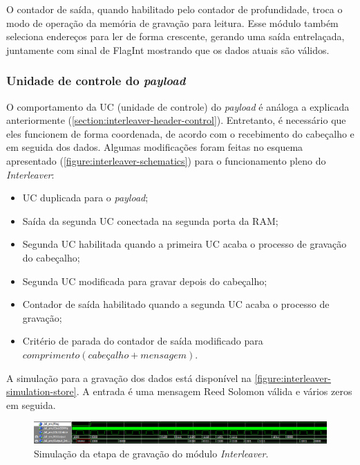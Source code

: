 	O contador de saída, quando habilitado pelo contador de profundidade, troca o modo de operação da memória de gravação para leitura. Esse módulo também seleciona endereços para ler de forma crescente, gerando uma saída entrelaçada, juntamente com sinal de FlagInt mostrando que os dados atuais são válidos.
	
	\subsubsection{Unidade de controle do \textit{payload}}
	
	O comportamento da UC (unidade de controle) do \textit{payload} é análoga a explicada anteriormente (\autoref{section:interleaver-header-control}). Entretanto, é necessário que eles funcionem de forma coordenada, de acordo com o recebimento do cabeçalho e em seguida dos dados. Algumas modificações foram feitas no esquema apresentado (\autoref{figure:interleaver-schematics}) para o funcionamento pleno do \textit{Interleaver}: 
	
	\begin{itemize}
		\item UC duplicada para o \textit{payload};
		\item Saída da segunda UC conectada na segunda porta da RAM;
		\item Segunda UC habilitada quando a primeira UC acaba o processo de gravação do cabeçalho;
		\item Segunda UC modificada para gravar depois do cabeçalho;
		\item Contador de saída habilitado quando a segunda UC acaba o processo de gravação;
		\item Critério de parada do contador de saída modificado para $comprimento(cabeçalho + mensagem)$.
	\end{itemize}
	
	A simulação para a gravação dos dados está disponível na \autoref{figure:interleaver-simulation-store}. A entrada é uma mensagem Reed Solomon válida e vários zeros em seguida.
	\begin{figure}[h]
		\caption{\label{figure:interleaver-simulation-store}Simulação da etapa de gravação do módulo \textit{Interleaver}.}
		\centering
		\includegraphics[width=1\textwidth]{interleaver/simulation-store.png}
	\end{figure}

